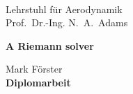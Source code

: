 


% 

\pagestyle{empty}

\begin{center}

\vspace*{-2.8cm}
\begin{minipage}[c]{.30\textwidth}
\end{minipage}
\begin{minipage}[c]{.43\textwidth}
    { ~\\ Lehrstuhl f\"{u}r Aerodynamik \\ Prof.~Dr.-Ing. N.~A.~Adams}%
\end{minipage}
\begin{minipage}[c]{.25\textwidth}
\end{minipage}

\vspace*{3.3cm}
\begin{minipage}[c]{11cm}
{\LARGE\bf 
A Riemann solver }
\end{minipage}

\vspace*{0.8cm}
Mark F\"{o}rster\\

\vspace*{2.8cm}
{\bfseries Diplomarbeit}


\end{center}
